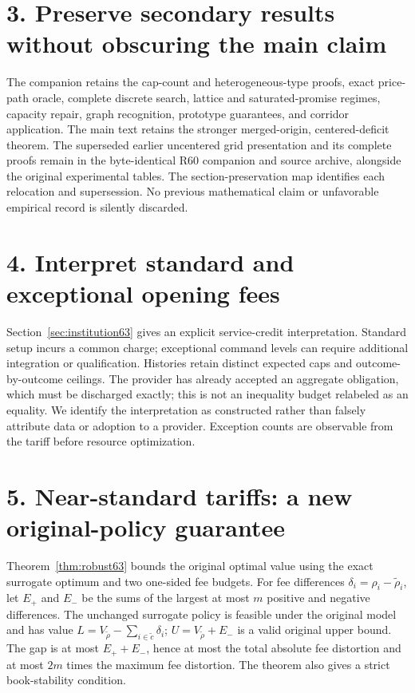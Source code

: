 \documentclass[11pt,letterpaper]{article}
\theoremstyle{definition}\newtheorem{remark}[theorem]{Remark}
\begin{document}
\section*{3. Preserve secondary results without obscuring the main claim}
The companion retains the cap-count and heterogeneous-type proofs, exact price-path oracle, complete discrete search, lattice and saturated-promise regimes, capacity repair, graph recognition, prototype guarantees, and corridor application. The main text retains the stronger merged-origin, centered-deficit theorem. The superseded earlier uncentered grid presentation and its complete proofs remain in the byte-identical R60 companion and source archive, alongside the original experimental tables. The section-preservation map identifies each relocation and supersession. No previous mathematical claim or unfavorable empirical record is silently discarded.

\section*{4. Interpret standard and exceptional opening fees}
Section~\ref{sec:institution63} gives an explicit service-credit interpretation. Standard setup incurs a common charge; exceptional command levels can require additional integration or qualification. Histories retain distinct expected caps and outcome-by-outcome ceilings. The provider has already accepted an aggregate obligation, which must be discharged exactly; this is not an inequality budget relabeled as an equality. We identify the interpretation as constructed rather than falsely attribute data or adoption to a provider. Exception counts are observable from the tariff before resource optimization.

\section*{5. Near-standard tariffs: a new original-policy guarantee}
Theorem~\ref{thm:robust63} bounds the original optimal value using the exact surrogate optimum and two one-sided fee budgets. For fee differences $\delta_i=\rho_i-\widetilde\rho_i$, let $E_+$ and $E_-$ be the sums of the largest at most $m$ positive and negative differences. The unchanged surrogate policy is feasible under the original model and has value $L=V_{\widetilde\rho}-\sum_{i\in\widetilde c}\delta_i$; $U=V_{\widetilde\rho}+E_-$ is a valid original upper bound. The gap is at most $E_++E_-$, hence at most the total absolute fee distortion and at most $2m$ times the maximum fee distortion. The theorem also gives a strict book-stability condition.
\end{document}
